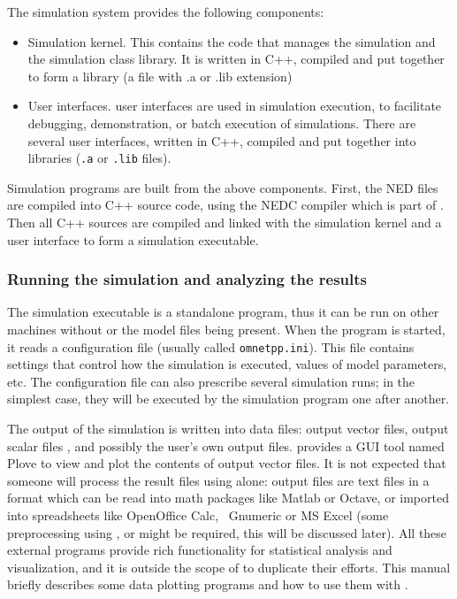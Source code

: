 The simulation system provides the following components:
\begin{itemize}
  \item{Simulation kernel. This contains the
    code that manages the simulation and the simulation class library.
    It is written in C++, compiled and put together to form a library
    (a file with .a or .lib extension)}
  \item{User interfaces.
     {\opp} user interfaces
    are used in simulation execution, to facilitate debugging,
    demonstration, or batch execution of simulations. There are
    several user interfaces, written in C++, compiled and put together
    into libraries (\texttt{.a} or \texttt{.lib} files).}
\end{itemize}


Simulation programs are built from the above components. First, the
NED files are compiled into C++ source code, using
the NEDC compiler which is part of {\opp}. Then
all C++ sources are compiled and linked with the simulation kernel and
a user interface to form a simulation executable.


\subsubsection{Running the simulation and analyzing the results}

The simulation executable is a standalone program,
thus it can be run on other machines without {\opp} or the model files
being present. When the program is started, it reads a configuration
file (usually called
\texttt{omnetpp.ini}). This file contains settings that
control how the simulation is executed, values of model parameters, etc.
The configuration file can also prescribe several simulation runs; in
the simplest case, they will be executed by the simulation program one
after another.

The output of the simulation is written into data files: output vector
files, output scalar files
, and possibly the user's own output files.
{\opp} provides a GUI tool named Plove to view and plot the contents
of output vector files. It is not expected that someone will
process the result files using {\opp} alone: output files are text
files in a format which can be read into math packages like Matlab 
or Octave, or imported into spreadsheets like OpenOffice Calc, \
Gnumeric or MS Excel (some preprocessing using ,  
or \fprog{perl} might be required, this will be discussed later).
All these external programs provide rich functionality for statistical 
analysis and visualization, and it is outside the scope of {\opp} to 
duplicate their efforts. This manual briefly describes
some data plotting programs and how to use them with {\opp}.

